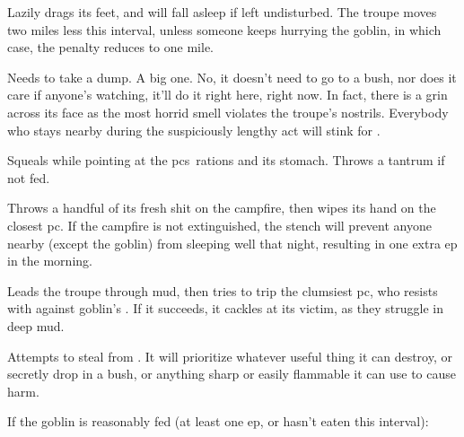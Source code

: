 \documentclass[10pt,twoside]{book}
\begin{document}
\begin{dlist}
  \item
  Lazily drags its feet, and will fall asleep if left undisturbed.
  The troupe moves two miles less this \gls{interval}, unless someone keeps hurrying the goblin, in which case, the penalty reduces to one mile.
  \item
  Needs to take a dump.
  A big one.
  No, it doesn't need to go to a bush, nor does it care if anyone's watching, it'll do it right here, right now.
  In fact, there is a grin across its face as the most horrid smell violates the troupe's nostrils.
  Everybody who stays nearby during the suspiciously lengthy act will stink for .
  \item
  Squeals while pointing at the \glspl{pc}~\glspl{ration} and its stomach.
  Throws a tantrum if not fed.
  \item
  Throws a handful of its fresh shit on the campfire, then wipes its hand on the closest \gls{pc}.
  If the campfire is not extinguished, the stench will prevent anyone nearby (except the goblin) from sleeping well that night, resulting in one extra \gls{ep} in the morning.
  \item
  Leads the troupe through mud, then tries to trip the clumsiest \gls{pc}, who resists with  against goblin's .
  If it succeeds, it cackles at its victim, as they struggle in deep mud.
  \item
  Attempts to steal from .
  It will prioritize whatever useful thing it can destroy, or secretly drop in a bush, or anything sharp or easily flammable it can use to cause harm.
\end{dlist}

If the goblin is reasonably fed (at least one \gls{ep}, or hasn't eaten this \gls{interval}):
\end{document}
